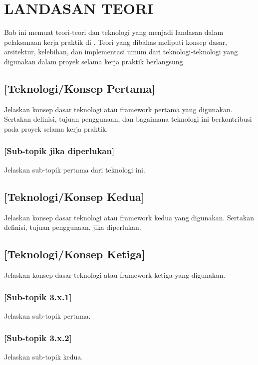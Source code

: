\chapter{LANDASAN TEORI}

Bab ini memuat teori-teori dan teknologi yang menjadi landasan dalam pelaksanaan
kerja praktik di \NamaPerusahaan. Teori yang dibahas meliputi konsep dasar,
arsitektur, kelebihan, dan implementasi umum dari teknologi-teknologi yang
digunakan dalam proyek selama kerja praktik berlangsung.


\section{[Teknologi/Konsep Pertama]}

Jelaskan konsep dasar teknologi atau framework pertama yang digunakan.
Sertakan definisi, tujuan penggunaan, dan bagaimana teknologi ini
berkontribusi pada proyek selama kerja praktik.

\subsection{[Sub-topik jika diperlukan]}

Jelaskan sub-topik pertama dari teknologi ini.

\section{[Teknologi/Konsep Kedua]}

Jelaskan konsep dasar teknologi atau framework kedua yang digunakan.
Sertakan definisi, tujuan penggunaan, jika diperlukan.

\section{[Teknologi/Konsep Ketiga]}

Jelaskan konsep dasar teknologi atau framework ketiga yang digunakan.

\subsection{[Sub-topik 3.x.1]}

Jelaskan sub-topik pertama.

\subsection{[Sub-topik 3.x.2]}

Jelaskan sub-topik kedua.

